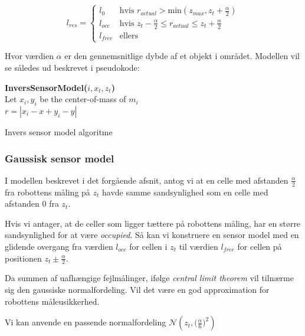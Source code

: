 $$l_{res} = \begin{cases} 
	l_0 &\text{hvis }r_{actual} > \text{min}(z_{max},z_t+\frac{\alpha}{2}) \\ 
	l_{occ} &\text{hvis } z_t-\frac{\alpha}{2} \leq r_{actual} \leq z_t+\frac{\alpha}{2}\\ 
	l_{free} &\text{ellers}  
\end{cases}$$

Hvor værdien $\alpha$ er den gennemsnitlige dybde af et objekt i området.
Modellen vil se således ud beskrevet i pseudokode:

\begin{algorithm}[H]
\textbf{InversSensorModel($i, x_t, z_t$)} \\
Let $x_i,y_i$ be the center-of-mass of $m_i$ \\
$r = |x_i - x + y_i - y|$ \\
\caption{Invers sensor model algoritme}
\label{alg:inversesensormodel}
\end{algorithm}

\subsubsection{Gaussisk sensor model}

I modellen beskrevet i det forgående afsnit, antog vi at en celle
med afstanden $\frac{\alpha}{2}$ fra robottens måling på $z_t$ havde
samme sandsynlighed som en celle med afstanden 0 fra $z_t$.

Hvis vi antager, at de celler som ligger tættere på robottens måling,
har en større sandsynlighed for at være \emph{occupied}. 
Så kan vi konstruere en sensor model med en glidende overgang fra værdien $l_{occ}$ for 
cellen i $z_t$ til værdien $l_{free}$ for cellen på positionen $z_t \pm \frac{\alpha}{2}$. 

Da summen af uafhængige fejlmålinger, ifølge \emph{central limit theorem} vil tilnærme sig
den gaussiske normalfordeling. \cite[p. 223]{ArtificialIntelligence}
Vil det være en god approximation for robottens måleusikkerhed.


Vi kan anvende en passende normalfordeling $\mathcal{N}(z_t,\big(\frac{\alpha}{6}\big)^2)$ 




